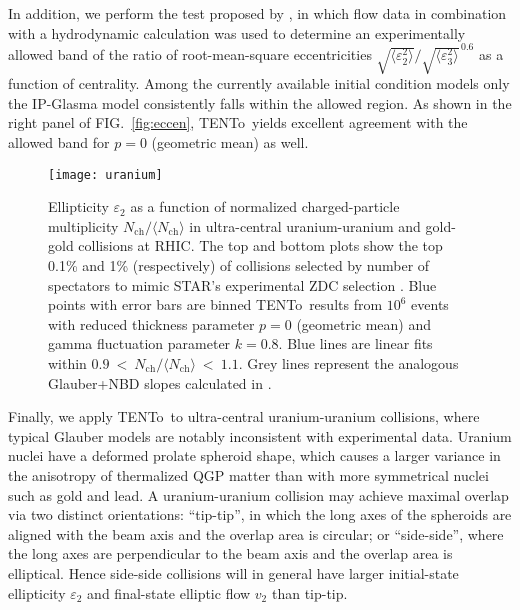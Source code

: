 \documentclass[aps,prc,reprint,amsmath,nofootinbib]{revtex4-1}
\newcommand{\trento}{T\raisebox{-.5ex}{R}ENTo}
\newcommand{\nch}{N_\text{ch}}
\newcommand{\eccratio}{\sqrt{\langle \varepsilon_2^2 \rangle}/\sqrt{\langle \varepsilon_3^2 \rangle}^{\,0.6}}
\begin{document}
In addition, we perform the test proposed by \cite{Retinskaya:2013gca}, in which  flow data in combination with a hydrodynamic calculation was used to determine an experimentally allowed band of the ratio of root-mean-square eccentricities $\eccratio$
as a function of centrality.  Among the currently available initial condition models only the IP-Glasma model consistently falls within the allowed region.
As shown in the right panel of FIG.~\ref{fig:eccen}, \trento\ yields excellent agreement with the allowed band for $p = 0$ (geometric mean) as well.


\begin{figure}[b]
  \centering
  \texttt{[image: uranium]}
  \caption{
    \label{fig:uranium}
    Ellipticity $\varepsilon_2$ as a function of normalized charged-particle multiplicity
    $\nch/\langle\nch\rangle$ in ultra-central uranium-uranium and gold-gold collisions at RHIC.  The top and
    bottom plots show the top 0.1\% and 1\% (respectively) of collisions selected by number of spectators to
    mimic STAR's experimental ZDC selection \cite{FortheSTAR:2013bza}.  Blue points with error bars are binned
    \protect\trento\ results from $10^6$ events with reduced thickness parameter $p = 0$ (geometric mean) and
    gamma fluctuation parameter $k = 0.8$.  Blue lines are linear fits within
    $0.9~<~\nch/\langle\nch\rangle~<~1.1$.  Grey lines represent the analogous Glauber+NBD slopes calculated
    in \cite{FortheSTAR:2013bza}.
  }
\end{figure}

Finally, we apply \trento\ to ultra-central uranium-uranium collisions, where typical Glauber models are notably inconsistent with experimental data.
Uranium nuclei have a deformed prolate spheroid shape, which causes a larger variance in the anisotropy of thermalized QGP matter than with more symmetrical nuclei such as gold and lead.
A uranium-uranium collision may achieve maximal overlap via two distinct orientations:
``tip-tip'', in which the long axes of the spheroids are aligned with the beam axis and the overlap area is circular;
or ``side-side'', where the long axes are perpendicular to the beam axis and the overlap area is elliptical.
Hence side-side collisions will in general have larger initial-state ellipticity $\varepsilon_2$ and final-state elliptic flow $v_2$ than tip-tip.
\end{document}

